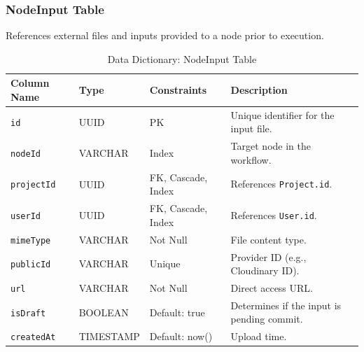\subsubsection{NodeInput Table}
References external files and inputs provided to a node prior to execution.
\begin{table}[H]
\centering
\renewcommand{\arraystretch}{1.3}
\begin{tabularx}{\textwidth}{|l|l|l|X|}
\hline
\textbf{Column Name} & \textbf{Type} & \textbf{Constraints} & \textbf{Description} \\
\hline
\texttt{id} & UUID & PK & Unique identifier for the input file. \\
\hline
\texttt{nodeId} & VARCHAR & Index & Target node in the workflow. \\
\hline
\texttt{projectId} & UUID & FK, Cascade, Index & References \texttt{Project.id}. \\
\hline
\texttt{userId} & UUID & FK, Cascade, Index & References \texttt{User.id}. \\
\hline
\texttt{mimeType} & VARCHAR & Not Null & File content type. \\
\hline
\texttt{publicId} & VARCHAR & Unique & Provider ID (e.g., Cloudinary ID). \\
\hline
\texttt{url} & VARCHAR & Not Null & Direct access URL. \\
\hline
\texttt{isDraft} & BOOLEAN & Default: true & Determines if the input is pending commit. \\
\hline
\texttt{createdAt} & TIMESTAMP & Default: now() & Upload time. \\
\hline
\end{tabularx}
\caption{Data Dictionary: NodeInput Table}
\label{tab:dict-nodeinput}
\end{table}

